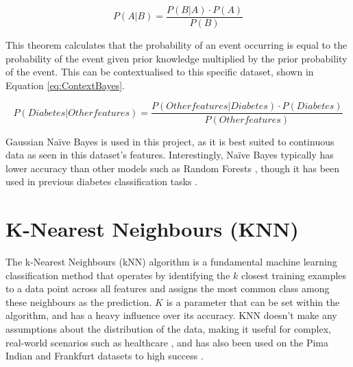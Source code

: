 \begin{equation}\label{eq:Bayes}
    P(A|B) = \frac{P(B|A) \cdot P(A)}{P(B)}
\end{equation}

\para This theorem calculates that the probability of an event occurring is equal to the probability of the event given 
prior knowledge multiplied by the prior probability of the event. This can be contextualised to this specific dataset, shown in Equation \ref{eq:ContextBayes}.

\begin{equation}\label{eq:ContextBayes}
    P(Diabetes | Other features) = \frac{P(Other features | Diabetes) \cdot P(Diabetes)}{P(Other features)}
\end{equation}

\para Gaussian Na\"ive Bayes is used in this project, as it is best suited to continuous data as seen in this dataset's 
features. Interestingly, Na\"ive Bayes typically has lower accuracy than other models such as Random Forests \autocite{khan_novel_2023},
though it has been used in previous diabetes classification tasks \autocite{aftab_cloud-based_2021, chang_pima_2023, zou_construction_2024}.

\section{K-Nearest Neighbours (KNN)}
The k-Nearest Neighbours (kNN) algorithm is a fundamental machine learning classification method that operates by identifying 
the $k$ closest training examples to a data point across all features and assigns the most common class among these neighbours 
as the prediction. $K$ is a parameter that can be set within the algorithm, and has a heavy influence over its accuracy.
KNN doesn't make any assumptions about the distribution of the data, making it useful for complex, real-world scenarios
such as healthcare \autocite{thomas_addressing_2021}, and has also been used on the Pima Indian and Frankfurt datasets
to high success \autocite{alzubi_diabetes_2023, zou_construction_2024}.

